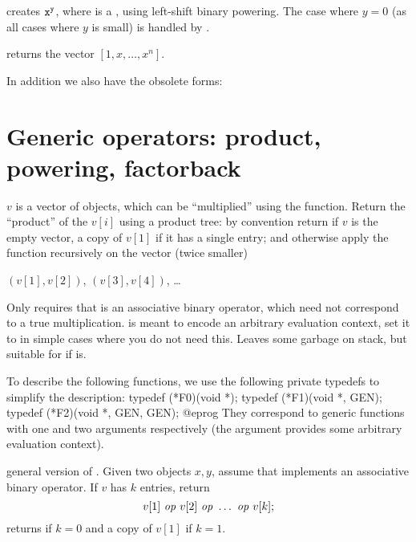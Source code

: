  creates ${\tt x}^{{\tt y}}$, where  is a
, using left-shift binary powering. The case where $y = 0$
(as all cases where $y$ is small) is handled by .

 returns the vector $[1,x,\dots,x^n]$.

In addition we also have the obsolete forms:





\section{Generic operators: product, powering, factorback}

 $v$ is a vector of
objects, which can be ``multiplied'' using the  function. Return
the ``product'' of the $v[i]$ using a product tree: by convention
return  if $v$ is the empty vector, a copy of $v[1]$ if it has a
single entry; and otherwise apply the function recursively on the vector
(twice smaller)

$(v[1],v[2])$, $(v[3],v[4])$, \dots

\noindent Only requires that  is an associative binary operator,
which need not correspond to a true multiplication.  is meant to encode
an arbitrary evaluation context, set it to  in simple cases where you
do not need this. Leaves some garbage on stack, but suitable for
 if  is.

To describe the following functions, we use the following private typedefs
to simplify the description:
\bprog
  typedef (*F0)(void *);
  typedef (*F1)(void *, GEN);
  typedef (*F2)(void *, GEN, GEN);
@eprog
\noindent They correspond to generic functions with one and two arguments
respectively (the  argument provides some arbitrary evaluation
context).

general version of . Given two objects
$x,y$, assume that  implements an associative binary
operator. If $v$ has $k$ entries, return
$$v[1]~\hbox{\it op\/}~v[2]~\hbox{\it op\/}~\ldots ~\hbox{\it op\/}~v[k];$$
returns  if $k = 0$ and a copy of $v[1]$ if $k = 1$.

